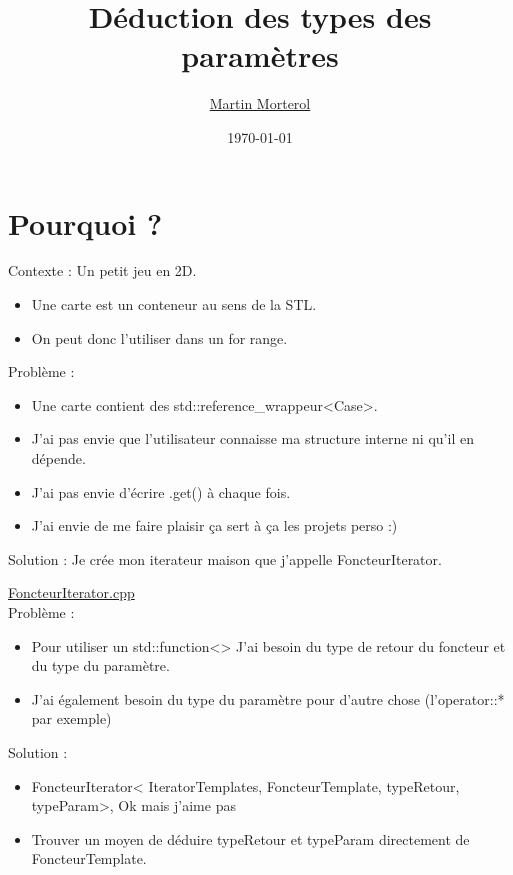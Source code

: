 \documentclass{beamer}
\title{Déduction des types des paramètres}
\author{\url{Martin Morterol}}
\date{\today}
\begin{document}
\begin{frame}[plain]
\titlepage
\end{frame}

\section{Pourquoi ?}

\begin{frame}
	Contexte : Un petit jeu en 2D.
    \begin{itemize}
    	\item Une carte est un conteneur au sens de la STL.
    	\item On peut donc l'utiliser dans un for range.
    \end{itemize}
    Problème : 
    \begin{itemize}
    	\item Une carte contient des std::reference\_wrappeur<Case>.
    	\item J'ai pas envie que l'utilisateur connaisse ma structure interne ni qu'il en dépende.
    	\item J'ai pas envie d’écrire .get() à chaque fois. 
    	\item J'ai envie de me faire plaisir ça sert à ça les projets perso :)
    \end{itemize}
    Solution : Je crée mon iterateur maison que j'appelle FoncteurIterator.
    
\end{frame}

\begin{frame}
	\href{run:FoncteurIterator.cpp}{FoncteurIterator.cpp}\\
	Problème : 
	\begin{itemize}
		\item Pour utiliser un std::function<> J'ai besoin du type de retour du foncteur et du type du paramètre. 
		\item J'ai également besoin du type du paramètre pour d'autre chose (l'operator::* par exemple)
	\end{itemize}
	Solution :
	\begin{itemize}
		\item FoncteurIterator< IteratorTemplates, FoncteurTemplate, typeRetour, typeParam>, Ok mais j'aime pas 
		\item Trouver un moyen de déduire typeRetour et typeParam directement de FoncteurTemplate. 
	\end{itemize}
\end{frame}
\end{document}
